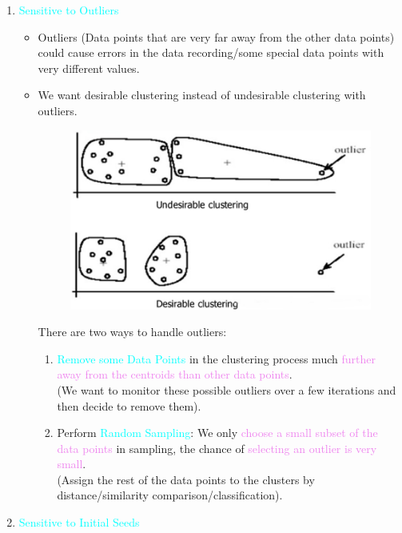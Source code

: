 \documentclass{book}
\begin{document}
\begin{enumerate}
    \item \textcolor{cyan}{Sensitive to Outliers}
    \begin{itemize}
        \item Outliers (Data points that are very far away from the other data points) could cause errors in the  data recording/some special data points with very different values.
        \item We want desirable clustering instead of undesirable clustering with outliers. \\
        \begin{figure}[h]
            \centering
            \includegraphics[scale=0.25]{chapter 5/ch5_figure10.jpeg}
        \end{figure}
        There are two ways to handle outliers:
        \begin{enumerate}
            \item \textcolor{cyan}{Remove some Data Points} in the clustering process much \textcolor{violet}{further away from the centroids than other data points}.\\
            (We want to monitor these possible outliers over a few iterations and then decide to remove them).
            \item Perform \textcolor{cyan}{Random Sampling}: We only \textcolor{violet}{choose a small subset of the data points} in sampling, the chance of \textcolor{violet}{selecting an outlier is very small}.\\
            (Assign the rest of the data points to the clusters by distance/similarity comparison/classification).
        \end{enumerate}
    \end{itemize}
    \item \textcolor{cyan}{Sensitive to Initial Seeds}

\end{enumerate}
\end{document}
